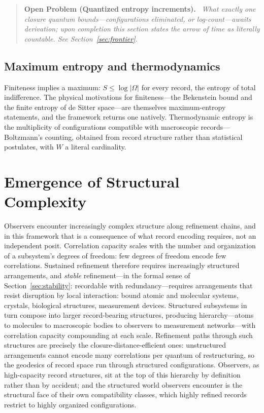 \documentclass[11pt]{article}
\theoremstyle{definition}
\theoremstyle{remark}
\newenvironment{openproblem}[1]{\begin{quote}\small\textbf{Open Problem (#1).}\ \itshape}{\end{quote}}
\begin{document}
\begin{openproblem}{Quantized entropy increments}
What exactly one closure quantum bounds---configurations eliminated, or log-count---awaits derivation; upon completion this section states the arrow of time as literally countable. See Section~\ref{sec:frontier}.
\end{openproblem}

\subsection{Maximum entropy and thermodynamics}
Finiteness implies a maximum: $S \le \log|\Omega|$ for every record, the entropy of total indifference. The physical motivations for finiteness---the Bekenstein bound \cite{Bekenstein1981} and the finite entropy of de Sitter space---are themselves maximum-entropy statements, and the framework returns one natively. Thermodynamic entropy is the multiplicity of configurations compatible with macroscopic records---Boltzmann's counting, obtained from record structure rather than statistical postulates, with $W$ a literal cardinality.

\section{Emergence of Structural Complexity}\label{sec:complexity}
Observers encounter increasingly complex structure along refinement chains, and in this framework that is a consequence of what record encoding requires, not an independent posit. Correlation capacity scales with the number and organization of a subsystem's degrees of freedom: few degrees of freedom encode few correlations. Sustained refinement therefore requires increasingly structured arrangements, and \emph{stable} refinement---in the formal sense of Section~\ref{sec:stability}: recordable with redundancy---requires arrangements that resist disruption by local interaction: bound atomic and molecular systems, crystals, biological structures, measurement devices. Structured subsystems in turn compose into larger record-bearing structures, producing hierarchy---atoms to molecules to macroscopic bodies to observers to measurement networks---with correlation capacity compounding at each scale. Refinement paths through such structures are precisely the closure-distance-efficient ones: unstructured arrangements cannot encode many correlations per quantum of restructuring, so the geodesics of record space run through structured configurations. Observers, as high-capacity record structures, sit at the top of this hierarchy by definition rather than by accident; and the structured world observers encounter is the structural face of their own compatibility classes, which highly refined records restrict to highly organized configurations.
\end{document}
